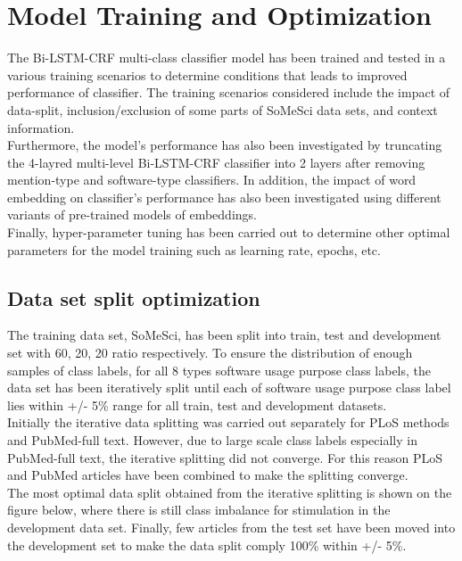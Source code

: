 \chapter{Model Training and Optimization}
\label{ch:chapter06}
 
%
%

The Bi-LSTM-CRF multi-class classifier model has been trained and tested in a various training scenarios to determine conditions that leads to improved performance of classifier. 
The training scenarios considered include the impact of data-split, inclusion/exclusion of some parts of SoMeSci data sets, and context information. \\ 

Furthermore, the model’s performance has also been investigated by truncating the 4-layred multi-level Bi-LSTM-CRF classifier into 2 layers after removing mention-type and software-type classifiers. 
In addition, the impact of word embedding on classifier’s performance  has also been investigated using different variants of pre-trained models of embeddings. \\

Finally, hyper-parameter tuning has been carried out to determine other optimal parameters for the model training such as  learning rate, epochs, etc.

\section{Data set split optimization}
\label{sec:chapter06:split}

The training data set, \ac{SoMeSci}, has been split into train, test and development set with  60, 20, 20 ratio respectively. To ensure the distribution  of enough samples of class labels, for all 8 types software usage purpose class labels, the data set has been iteratively split until each of software usage purpose class label lies within +/- 5\%  range for all train, test and development datasets. \\
 
Initially the iterative data splitting was carried out separately for PLoS methods and PubMed-full text. However, due to large scale class labels especially in PubMed-full text, the iterative splitting did not converge. For this reason PLoS and PubMed articles have been combined to make the splitting converge. \\

The most optimal data split obtained from the iterative splitting is shown on the figure below, where there is still class imbalance for stimulation in the development data set. Finally, few articles from the test set have been moved into the development set to make the data split comply 100\% within +/- 5\%. \\

